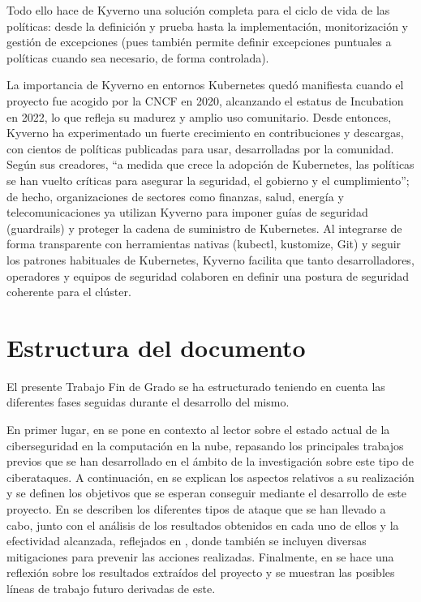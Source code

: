 \documentclass[12pt,twoside,titlepage]{report}
\begin{document}
Todo ello hace de Kyverno una solución completa para el ciclo de vida de las políticas: desde la definición y prueba hasta la implementación, monitorización y gestión de excepciones (pues también permite definir excepciones puntuales a políticas cuando sea necesario, de forma controlada).

La importancia de Kyverno en entornos Kubernetes quedó manifiesta cuando el proyecto fue acogido por la CNCF en 2020, alcanzando el estatus de Incubation en 2022, lo que refleja su madurez y amplio uso comunitario. Desde entonces, Kyverno ha experimentado un fuerte crecimiento en contribuciones y descargas, con cientos de políticas publicadas para usar, desarrolladas por la comunidad. Según sus creadores, “a medida que crece la adopción de Kubernetes, las políticas se han vuelto críticas para asegurar la seguridad, el gobierno y el cumplimiento”; de hecho, organizaciones de sectores como finanzas, salud, energía y telecomunicaciones ya utilizan Kyverno para imponer guías de seguridad (guardrails) y proteger la cadena de suministro de Kubernetes. Al integrarse de forma transparente con herramientas nativas (kubectl, kustomize, Git) y seguir los patrones habituales de Kubernetes, Kyverno facilita que tanto desarrolladores, operadores y equipos de seguridad colaboren en definir una postura de seguridad coherente para el clúster.

\section{Estructura del documento}

El presente Trabajo Fin de Grado se ha estructurado teniendo en cuenta las diferentes fases seguidas durante el desarrollo del mismo.

En primer lugar, en  se pone en contexto al lector sobre el estado actual de la ciberseguridad en la computación en la nube, repasando los principales trabajos previos que se han desarrollado en el ámbito de la investigación sobre este tipo de ciberataques. A continuación, en 
 se explican los aspectos relativos a su realización y se definen los objetivos que se esperan conseguir mediante el desarrollo de este proyecto. En  se describen los diferentes tipos de ataque que se han llevado a cabo, junto con el análisis de los resultados obtenidos en cada uno de ellos y la efectividad alcanzada, reflejados en , donde también se incluyen diversas mitigaciones para prevenir las acciones realizadas. Finalmente, en  se hace una reflexión sobre los resultados extraídos del proyecto y se muestran las posibles líneas de trabajo futuro derivadas de este.
\end{document}
